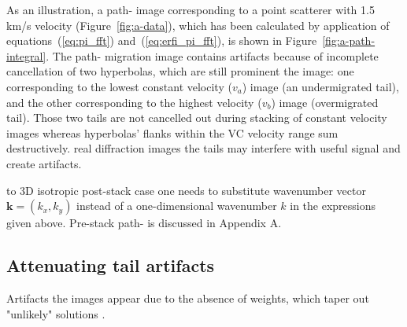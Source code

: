 
As an illustration, a path- image corresponding to a point scatterer with 1.5 km/s velocity
(Figure~\ref{fig:a-data}), which has been calculated
by application of equations~(\ref{eq:pi_fft}) and~(\ref{eq:erfi_pi_fft}), is shown in Figure~\ref{fig:a-path-integral}.
The path- migration image contains artifacts because of incomplete cancellation of two hyperbolas, which are still prominent  the image: 
one corresponding to the lowest constant velocity ($v_a$) image (an undermigrated tail), and the other corresponding
to the highest velocity ($v_b$) image (overmigrated tail).
Those two tails are not cancelled out during stacking of constant velocity images whereas hyperbolas' 
flanks within the VC velocity range sum destructively. 
real diffraction images the tails may 
interfere with useful signal and create artifacts.

 to 3D isotropic
post-stack case one needs to substitute  wavenumber vector $\mathbf{k} = (k_x,k_y)$ instead of a 
one-dimensional wavenumber $k$ in the expressions given above. Pre-stack path-
 is discussed in Appendix A.  

\subsection{Attenuating tail artifacts}

Artifacts  the  images appear due to the absence of weights, which 
 taper out "unlikely" solutions \cite[]{landa_etal06,landabook,schleicher_costa09}.%

